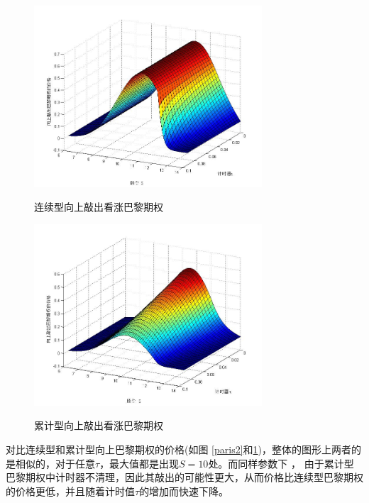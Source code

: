 \documentclass{ctexart} %
\begin{document}
\fi
\begin{figure}[H]
\begin{minipage}{0.48\linewidth}
\label{paris2}
\includegraphics[width=8.5cm]{code/paris2.jpg}
\caption{连续型向上敲出看涨巴黎期权}
\end{minipage}
\begin{minipage}{0.48\linewidth}
\label{parisc2}
\includegraphics[width=8.5cm]{code/parisc2.jpg}
\caption{累计型向上敲出看涨巴黎期权}
\end{minipage}
\end{figure}
对比连续型和累计型向上巴黎期权的价格(如图 \ref{paris2}和\ref{parisc2})，整体的图形上两者的是相似的，对于任意$\tau$，最大值都是出现$S=10$处。而同样参数下 ， 由于累计型巴黎期权中计时器不清理，因此其敲出的可能性更大，从而价格比连续型巴黎期权的价格更低，并且随着计时值$\tau$的增加而快速下降。
\iffalse
\end{document}
